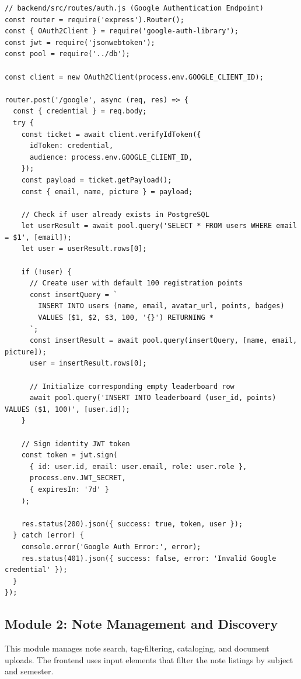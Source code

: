 \documentclass[12,Times new Roman,a4paper]{report}
\begin{document}
\begin{verbatim}
// backend/src/routes/auth.js (Google Authentication Endpoint)
const router = require('express').Router();
const { OAuth2Client } = require('google-auth-library');
const jwt = require('jsonwebtoken');
const pool = require('../db');

const client = new OAuth2Client(process.env.GOOGLE_CLIENT_ID);

router.post('/google', async (req, res) => {
  const { credential } = req.body;
  try {
    const ticket = await client.verifyIdToken({
      idToken: credential,
      audience: process.env.GOOGLE_CLIENT_ID,
    });
    const payload = ticket.getPayload();
    const { email, name, picture } = payload;

    // Check if user already exists in PostgreSQL
    let userResult = await pool.query('SELECT * FROM users WHERE email = $1', [email]);
    let user = userResult.rows[0];

    if (!user) {
      // Create user with default 100 registration points
      const insertQuery = `
        INSERT INTO users (name, email, avatar_url, points, badges) 
        VALUES ($1, $2, $3, 100, '{}') RETURNING *
      `;
      const insertResult = await pool.query(insertQuery, [name, email, picture]);
      user = insertResult.rows[0];
      
      // Initialize corresponding empty leaderboard row
      await pool.query('INSERT INTO leaderboard (user_id, points) VALUES ($1, 100)', [user.id]);
    }

    // Sign identity JWT token
    const token = jwt.sign(
      { id: user.id, email: user.email, role: user.role },
      process.env.JWT_SECRET,
      { expiresIn: '7d' }
    );

    res.status(200).json({ success: true, token, user });
  } catch (error) {
    console.error('Google Auth Error:', error);
    res.status(401).json({ success: false, error: 'Invalid Google credential' });
  }
});
\end{verbatim}
\label{lst:auth_code}

\subsection{Module 2: Note Management and Discovery}

This module manages note search, tag-filtering, cataloging, and document uploads. The frontend uses input elements that filter the note listings by subject and semester. 
\end{document}

